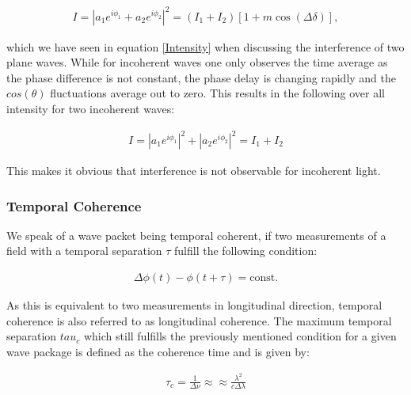 \begin{align}
I=\left| a_1 e^{i \phi_1} + a_2 e^{i \phi_2} \right|^2 = \left(I_1+I_2 \right) \left[ 1 + m \cos(\Delta \delta)\right], 
\end{align}

which we have seen in equation \ref{Intensity} when discussing the interference of two plane waves.
While for incoherent waves one only observes the time average as the phase difference is not constant, the phase delay is changing rapidly and the $cos(\theta)$ fluctuations average out to zero. This results in the following over all intensity for two incoherent waves:

\begin{align}
I=\left| a_1 e^{i \phi_1} \right|^2+ \left| a_2 e^{i \phi_2}\right|^2 = I_1+I_2
\end{align}

This makes it obvious that interference is not observable for incoherent light.\cite{coherence}




\subsubsection{Temporal Coherence}
We speak of a wave packet being temporal coherent, if two measurements of a field with a temporal separation $\tau$ fulfill the following condition:

\begin{align}
\Delta \phi \left( t \right) - \phi\left( t + \tau\right)  = \text{const.}
\end{align}

As this is equivalent to two measurements in longitudinal direction, temporal coherence is also referred to as longitudinal coherence. The maximum temporal separation $tau_c$ which still fulfills the previously mentioned condition for a given wave package is defined as the coherence time and is given by:

\begin{align}
\tau_c = \frac{1}{\Delta \nu} \approx\approx \frac{\lambda^2}{c\Delta \lambda}
\end{align}

